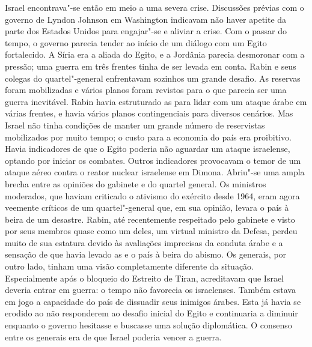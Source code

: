 Israel encontrava"-se então em meio a uma severa crise. Discussões
prévias com o governo de Lyndon Johnson em Washington indicavam não
haver apetite da parte dos Estados Unidos para engajar"-se e aliviar a crise. Com o
passar do tempo, o governo parecia tender ao início de um diálogo
com um Egito fortalecido. A Síria era a aliada do Egito, e a Jordânia
parecia desmoronar com a pressão; uma guerra em três frentes tinha de
ser levada em conta. Rabin e seus colegas do quartel"-general enfrentavam
sozinhos um grande desafio. As reservas foram mobilizadas e vários
planos foram revistos para o que parecia ser uma guerra inevitável.
Rabin havia estruturado as  para lidar com um ataque árabe em várias
frentes, e havia vários planos contingenciais para diversos cenários. Mas
Israel não tinha condições de manter um grande número de reservistas
mobilizados por muito tempo; o custo para a economia do país era
proibitivo. Havia indicadores de que o Egito poderia não aguardar um
ataque israelense, optando por iniciar os combates. Outros indicadores
provocavam o temor de um ataque aéreo contra o reator nuclear israelense
em Dimona. Abriu"-se uma ampla brecha entre as opiniões do gabinete e do
quartel general. Os ministros moderados, que haviam criticado o ativismo
do exército desde 1964, eram agora veemente críticos de um quartel"-general
que, em sua opinião, levara o país à beira de um desastre. Rabin,
até recentemente respeitado pelo gabinete e visto por seus membros quase
como um deles, um virtual ministro da Defesa, perdeu muito de sua
estatura devido às avaliações imprecisas da conduta árabe e a sensação
de que havia levado as  e o país à beira do abismo. Os generais, por
outro lado, tinham uma visão completamente diferente da situação.
Especialmente após o bloqueio do Estreito de Tiran, acreditavam que Israel
deveria entrar em guerra: o tempo não favorecia os israelenses. Também
estava em jogo a capacidade do país de dissuadir seus inimigos árabes.
Esta já havia se erodido ao não responderem ao desafio inicial do Egito
e continuaria a diminuir enquanto o governo hesitasse e buscasse uma
solução diplomática. O consenso entre os generais era de que Israel
poderia vencer a guerra.

